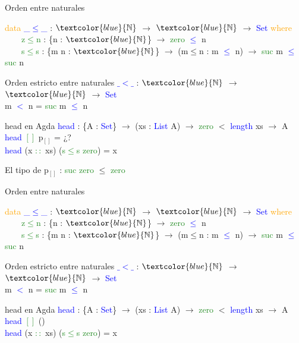 \documentclass[xcolor=dvipsnames]{beamer} %
\newcommand{\cf}[1]{\textcolor{blue}{#1}}
\newcommand{\ct}[1]{\textcolor{blue}{#1}}
\newcommand{\cc}[1]{\textcolor{ForestGreen}{#1}}
\newcommand{\ck}[1]{\textcolor{orange}{#1}}
\newcommand{\N}{\ct{\mathbb{N}}}
\newcommand{\ra}{\rightarrow}
\begin{document}
\begin{frame}

\begin{block}{Orden entre naturales}

\ck{data} \ct{\_$\leq$\_} : $\N$ $\ra$ $\N$ $\ra$ \ct{Set} \ck{where}\\
\ \ \ \ \cc{z$\leq$n} : \{n : $\N$\}                 $\ra$ \cc{zero}  \ct{$\leq$} n\\
\ \ \ \ \cc{s$\leq$s} : \{m n : $\N$\} $\ra$ (m$\leq$n : m \ct{$\leq$} n) $\ra$ \cc{suc} m \ct{$\leq$} \cc{suc} n

\end{block}

\begin{block}{Orden estricto entre naturales}
\cf{$\_<\_$} : $\N$ $\ra$ $\N$ $\ra$ \ct{Set}\\
m \cf{$<$} n = \cc{suc} m \cf{$\leq$} n
\end{block}

\begin{block}{head en Agda}
    \cf{head} : \{A : \ct{Set}\}  $\ra$ (xs : \ct{List} A) $\ra$ 
    \cc{zero} $<$ \ct{length} xs $\rightarrow$ A \\
    \cf{head} \cc{$[]$} p$_{[]}$ = ¿?\\
    \cf{head} (x \cc{$::$} xs) (\cc{s$\leq$s} \cc{zero}) = x
  \end{block}  

\begin{block}{}
El tipo de p$_{[]}$ : \cc{suc} \cc{zero} $\leq$ \cc{zero}
\end{block}

\end{frame}

\begin{frame}

\begin{block}{Orden entre naturales}

\ck{data} \ct{\_$\leq$\_} : $\N$ $\ra$ $\N$ $\ra$ \ct{Set} \ck{where}\\
\ \ \ \ \cc{z$\leq$n} : \{n : $\N$\}                 $\ra$ \cc{zero}  \ct{$\leq$} n\\
\ \ \ \ \cc{s$\leq$s} : \{m n : $\N$\} $\ra$ (m$\leq$n : m \ct{$\leq$} n) $\ra$ \cc{suc} m \ct{$\leq$} \cc{suc} n

\end{block}

\begin{block}{Orden estricto entre naturales}
\cf{$\_<\_$} : $\N$ $\ra$ $\N$ $\ra$ \ct{Set}\\
m \cf{$<$} n = \cc{suc} m \cf{$\leq$} n
\end{block}

\begin{block}{head en Agda}
    \cf{head} : \{A : \ct{Set}\}  $\ra$ (xs : \ct{List} A) $\ra$ 
    \cc{zero} $<$ \ct{length} xs $\rightarrow$ A \\
    \cf{head} \cc{$[]$} ()\\
    \cf{head} (x \cc{$::$} xs) (\cc{s$\leq$s} \cc{zero}) = x
\end{block}  

\end{frame}
\end{document}
